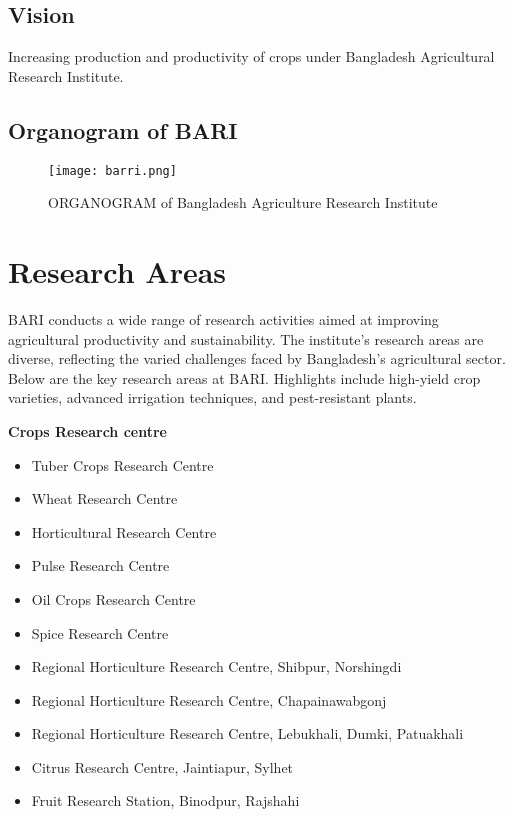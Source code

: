 \documentclass[oneside,12pt,fleqn]{book}
\begin{document}
\subsection{Vision}
Increasing production and productivity of crops under Bangladesh Agricultural Research Institute.
\newpage
\subsection{Organogram of BARI}

\begin{figure}[h!]
    \centering
    \texttt{[image: barri.png]} %
    \caption{ORGANOGRAM     of Bangladesh Agriculture Research Institute}
    \label{fig:sample} %
\end{figure}
\section{Research Areas}
BARI conducts a wide range of research activities aimed at improving agricultural productivity and sustainability. The institute’s research areas are diverse, reflecting the varied challenges faced by Bangladesh's agricultural sector. Below are the key research areas at BARI. Highlights include high-yield crop varieties, advanced irrigation techniques, and pest-resistant plants.

\textbf{Crops Research centre}
\begin{itemize}
    \item Tuber Crops Research Centre
    \item Wheat Research Centre
    \item Horticultural Research Centre
    \item Pulse Research Centre
    \item Oil Crops Research Centre
    \item Spice Research Centre
    \item Regional Horticulture Research Centre, Shibpur, Norshingdi
    \item  Regional Horticulture Research Centre, Chapainawabgonj
    \item  Regional Horticulture Research Centre, Lebukhali, Dumki, Patuakhali
    \item Citrus Research Centre, Jaintiapur, Sylhet
    \item Fruit Research Station, Binodpur, Rajshahi
\end{itemize}
\end{document}
